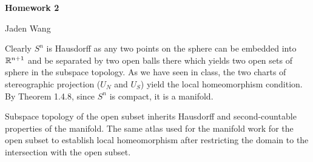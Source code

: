 \documentclass[12pt]{article}
\begin{document}
\centerline {\textsf{\textbf{\LARGE{Homework 2}}}}
\centerline {Jaden Wang}
\vspace{.15in}

\begin{problem}[2.1.5.1]
Clearly $ S^{n}$ is Hausdorff as any two points on the sphere can be embedded into $ \mathbb{R}^{n+1}$ and be separated by two open balls there which yields two open sets of sphere in the subspace topology. As we have seen in class, the two charts of stereographic projection ($ U_N$ and  $ U_S$) yield the local homeomorphism condition. By Theorem 1.4.8, since $ S^{n}$ is compact, it is a manifold.
\end{problem}

\begin{problem}[2.1.5.2]
Subspace topology of the open subset inherits Hausdorff and second-countable properties of the manifold. The same atlas used for the manifold work for the open subset to establish local homeomorphism after restricting the domain to the intersection with the open subset.
\end{problem}
\end{document}
